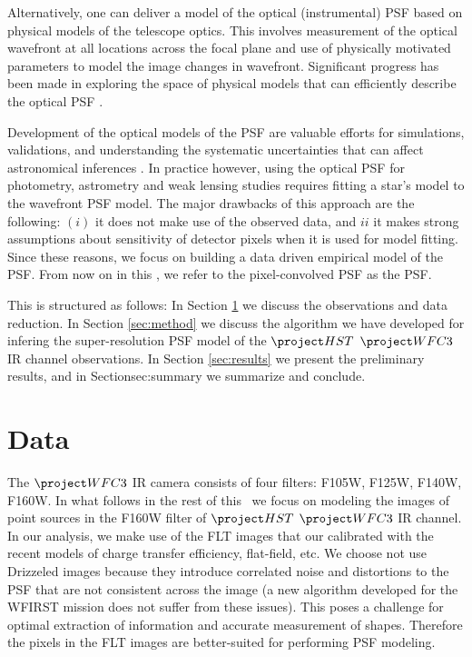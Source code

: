 Alternatively, one can deliver a model of the optical (instrumental) PSF based on physical models of the telescope optics. 
This involves measurement of the optical wavefront at all locations across the focal plane and use of physically motivated parameters 
to model the image changes in wavefront. Significant progress has been made in exploring the space of physical models that can efficiently 
describe the optical PSF \citep{zernike,krist1995,krist2011,galsim_software}. 

Development of the optical models of the PSF are valuable efforts for simulations, validations, and understanding the systematic uncertainties 
that can affect astronomical inferences \citep{great3,galsim}. In practice however, using the optical PSF for photometry, astrometry and weak lensing studies 
requires fitting a star's model to the wavefront PSF model. The major drawbacks of this approach are the following: $(i)$ it does not make use of the observed 
data, and ${ii}$ it makes strong assumptions about sensitivity of detector pixels when it is used for model fitting. Since these reasons, we focus on building a 
data driven empirical model of the PSF. From now on in this \paper, we refer to the pixel-convolved PSF as the PSF. 


This \paper is structured as follows: In Section \ref{sec:data} we discuss the observations and data reduction. In Section \ref{sec:method} we discuss the algorithm we 
have developed for infering the super-resolution PSF model of the $\hst$ $\wfc$ IR channel observations. In Section \ref{sec:results} we present the preliminary results, and 
in Section{sec:summary} we summarize and conclude. 

\section{Data}\label{sec:data}

The $\wfc$ IR camera consists of four filters: F105W, F125W, F140W, F160W.
In what follows in the rest of this \paper\ we focus on modeling the images of point sources in the F160W filter of $\hst$ $\wfc$ IR channel. 
In our analysis, we make use of the FLT images that our calibrated with the recent models of charge transfer efficiency, flat-field, etc. 
We choose not use Drizzeled images \citep{drizzle,astrodrizzle} because they introduce correlated noise and 
distortions to the PSF that are not consistent across the image (a new algorithm \citep{olic} developed for the WFIRST mission does not suffer from these issues). 
This poses a challenge for optimal extraction of information and accurate measurement of shapes. Therefore the pixels in the FLT images are better-suited for performing PSF modeling. 

